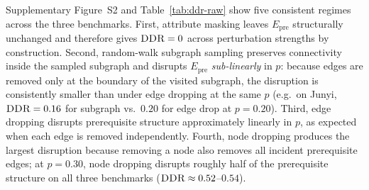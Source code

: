 \documentclass[preprint,10pt,doubleblind]{elsarticle}
\newcommand{\Epre}{\ensuremath{E_{\text{pre}}}}
\newcommand{\DDR}{\textsc{DDR}}
\begin{document}

Supplementary Figure~S2 and Table~\ref{tab:ddr-raw} show five
consistent regimes across the three benchmarks. First, attribute
masking leaves $\Epre$ structurally unchanged and therefore gives
$\DDR{}=0$ across perturbation strengths by construction. Second,
random-walk subgraph sampling preserves connectivity inside the
sampled subgraph and disrupts $\Epre$ \emph{sub-linearly} in $p$:
because edges are removed only at the boundary of the visited
subgraph, the disruption is consistently smaller than under
edge dropping at the same $p$ (e.g.\ on Junyi, $\DDR{} = 0.16$ for
subgraph vs.\ $0.20$ for edge drop at $p=0.20$). Third, edge dropping
disrupts prerequisite structure approximately linearly in $p$, as
expected when each edge is removed independently. Fourth, node
dropping produces the largest disruption because removing a node also
removes all incident prerequisite edges; at $p = 0.30$, node dropping
disrupts roughly half of the prerequisite structure on all three
benchmarks ($\DDR{} \approx 0.52$--$0.54$).
\end{document}
